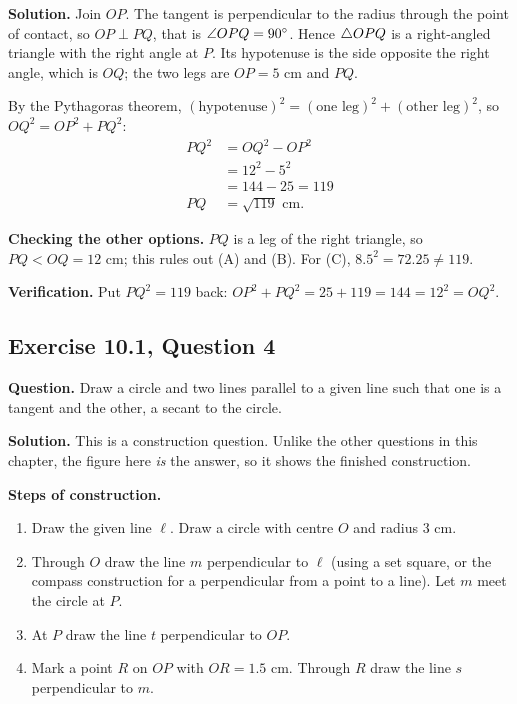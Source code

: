 \textbf{Solution.} Join $OP$. The tangent is perpendicular to the radius through the point of contact, so $OP\perp PQ$, that is $\angle OPQ=90^\circ$. Hence $\triangle OPQ$ is a right-angled triangle with the right angle at $P$. Its hypotenuse is the side opposite the right angle, which is $OQ$; the two legs are $OP=5$ cm and $PQ$.

By the Pythagoras theorem, $(\text{hypotenuse})^2=(\text{one leg})^2+(\text{other leg})^2$, so $OQ^2=OP^2+PQ^2$:
\begin{align*}
PQ^2&=OQ^2-OP^2\\
&=12^2-5^2\\
&=144-25=119\\
PQ&=\sqrt{119}\text{ cm}.
\end{align*}

\textbf{Checking the other options.} $PQ$ is a leg of the right triangle, so $PQ<OQ=12$ cm; this rules out (A) and (B). For (C), $8.5^2=72.25\neq119$.

\textbf{Verification.} Put $PQ^2=119$ back: $OP^2+PQ^2=25+119=144=12^2=OQ^2$.


\subsection*{Exercise 10.1, Question 4}
\textbf{Question.} Draw a circle and two lines parallel to a given line such that one is a tangent and the other, a secant to the circle.

\textbf{Solution.} This is a construction question. Unlike the other questions in this chapter, the figure here \emph{is} the answer, so it shows the finished construction.

\textbf{Steps of construction.}
\begin{enumerate}[label=\arabic*.,leftmargin=*,itemsep=1pt]
\item Draw the given line $\ell$. Draw a circle with centre $O$ and radius $3$ cm.
\item Through $O$ draw the line $m$ perpendicular to $\ell$ (using a set square, or the compass construction for a perpendicular from a point to a line). Let $m$ meet the circle at $P$.
\item At $P$ draw the line $t$ perpendicular to $OP$.
\item Mark a point $R$ on $OP$ with $OR=1.5$ cm. Through $R$ draw the line $s$ perpendicular to $m$.
\end{enumerate}

